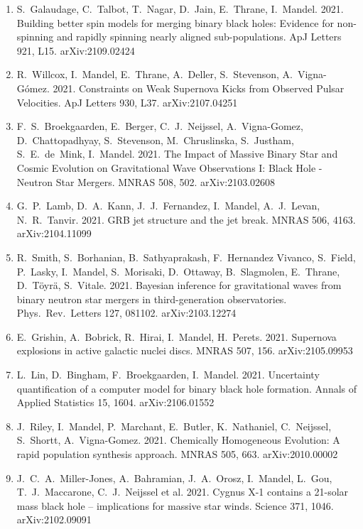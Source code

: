 \documentclass[margin,line]{res}
\begin{document}
\begin{resume}
\begin{enumerate}
\item S.~Galaudage, C.~Talbot, T.~Nagar, D.~Jain, E.~Thrane, I.~Mandel.  2021. Building better spin models for merging binary black holes: Evidence for non-spinning and rapidly spinning nearly aligned sub-populations. ApJ Letters 921, L15.  arXiv:2109.02424

\item R.~Willcox, I.~Mandel, E.~Thrane, A.~Deller, S.~Stevenson, A.~Vigna-G{\'o}mez.  2021. Constraints on Weak Supernova Kicks from Observed Pulsar Velocities.  ApJ Letters 930, L37.  arXiv:2107.04251 

\item F.~S.~Broekgaarden, E.~Berger, C.~J.~Neijssel, A.~Vigna-Gomez, D.~Chattopadhyay, S.~Stevenson, M.~Chruslinska, S.~Justham, S.~E.~de~Mink, I.~Mandel. 2021. The Impact of Massive Binary Star and Cosmic Evolution on Gravitational Wave Observations I: Black Hole - Neutron Star Mergers.  MNRAS 508, 502. arXiv:2103.02608

\item G.~P.~Lamb, D.~A.~Kann, J.~J.~Fernandez, I.~Mandel, A.~J.~Levan, N.~R.~Tanvir. 2021. GRB jet structure and the jet break. MNRAS 506, 4163.  arXiv:2104.11099

\item R.~Smith, S.~Borhanian, B.~Sathyaprakash, F.~Hernandez Vivanco, S.~Field, P.~Lasky, I.~Mandel, S.~Morisaki, D.~Ottaway, B.~Slagmolen, E.~Thrane, D.~T\"{o}yr\"{a}, S.~Vitale.  2021.  Bayesian inference for gravitational waves from binary neutron star mergers in third-generation observatories.  Phys.~Rev.~Letters 127, 081102. arXiv:2103.12274

\item E.~Grishin, A.~Bobrick, R.~Hirai, I.~Mandel, H.~Perets. 2021.  Supernova explosions in active galactic nuclei discs.  MNRAS 507, 156.  arXiv:2105.09953

\item L.~Lin, D.~Bingham, F.~Broekgaarden, I.~Mandel. 2021. Uncertainty quantification of a computer model for binary black hole formation. Annals of Applied Statistics 15, 1604.  arXiv:2106.01552 

\item J.~Riley, I.~Mandel, P.~Marchant, E.~Butler, K.~Nathaniel, C.~Neijssel, S.~Shortt, A.~Vigna-Gomez.  2021. Chemically Homogeneous Evolution: A rapid population synthesis approach. MNRAS 505, 663.  arXiv:2010.00002

\item J.~C.~A.~Miller-Jones, A.~Bahramian, J.~A.~Orosz, I.~Mandel, L.~Gou, T.~J.~Maccarone, C.~J.~Neijssel et al.  2021.  Cygnus X-1 contains a 21-solar mass black hole -- implications for massive star winds.  Science 371, 1046. arXiv:2102.09091


\end{enumerate}
\end{resume}
\end{document}
